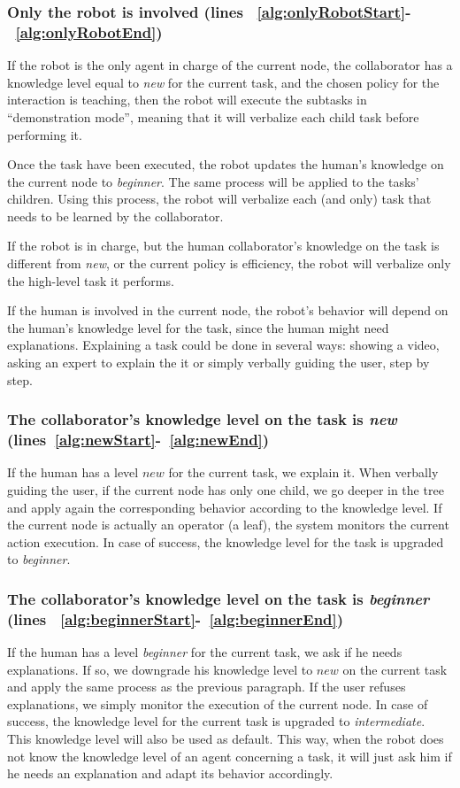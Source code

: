 \subsubsection{Only the robot is involved (lines ~\ref{alg:onlyRobotStart}-~\ref{alg:onlyRobotEnd})}
If the robot is the only agent in charge of the current node, the collaborator has a knowledge level equal to \textit{new} for the current task,
and the chosen policy for the interaction is teaching, then the robot will execute the subtasks in ``demonstration mode'', meaning that it will verbalize each child task before performing it.

Once the task have been executed, the robot updates the human's knowledge on the current node to \textit{beginner}. The same process will be applied to the tasks' children.  Using this process, the robot will verbalize each (and only) task that needs to be learned by the collaborator.

If the robot is in charge, but the human collaborator's knowledge on the task is different from \textit{new}, or the current policy is efficiency, the robot will verbalize only the high-level task it performs.

If the human is involved in the current node, the robot's behavior will depend on the human's knowledge level for the task, since the human might need explanations.  Explaining a task could be done in several ways: showing a video, asking an expert to explain the it or simply verbally guiding the user, step by step.
\subsubsection{The collaborator's knowledge level on the task is \textit{new} (lines~\ref{alg:newStart}-~\ref{alg:newEnd})}
If the human has a level $new$ for the current task, we explain it.
When verbally guiding the user, if the current node has only one child, we  go deeper in the tree and apply again the corresponding behavior according to the knowledge level. If the current node is actually an operator (a leaf), the system monitors the current action execution. In case of success, the knowledge level for the task is upgraded to \textit{beginner}.

\subsubsection{The collaborator's knowledge level on the task is \textit{beginner} (lines ~\ref{alg:beginnerStart}-~\ref{alg:beginnerEnd})}
 If the human has a level \textit{beginner} for the current task, we ask if he needs explanations. If so, we downgrade his knowledge level to $new$ on the current task and apply the same process as the previous paragraph. If the user refuses explanations, we simply monitor the execution of the current node. In case of success, the knowledge level for the current task is upgraded to \textit{intermediate}. This knowledge level will also be used as default. This way, when the robot does not know the knowledge level of an agent concerning a task, it will just ask him if he needs an explanation and adapt its behavior accordingly.

